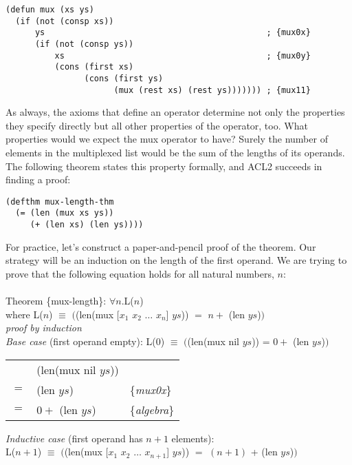 \label{mux-defun}
\begin{code}
\begin{verbatim}
(defun mux (xs ys)
  (if (not (consp xs))
      ys                                             ; {mux0x}
      (if (not (consp ys))
          xs                                         ; {mux0y}
          (cons (first xs)
                (cons (first ys)
                      (mux (rest xs) (rest ys))))))) ; {mux11}
\end{verbatim}
\end{code}

As always, the axioms that define an operator
determine not only the properties they specify directly
but all other properties of the operator, too.
What properties would we expect the \textsf{mux} operator to have?
Surely the number of elements in the multiplexed list
would be the sum of the lengths of its operands.
The following theorem states this property formally,
and ACL2 succeeds in finding a proof:

\label{mux-length-thm}
\begin{code}
\begin{verbatim}
(defthm mux-length-thm
  (= (len (mux xs ys))
     (+ (len xs) (len ys))))
\end{verbatim}
\end{code}

For practice, let's construct a paper-and-pencil proof of the theorem. %
Our strategy will be an induction on the length of the first operand.
We are trying to prove that the following equation holds for all natural numbers, $n$:\\
~\\
Theorem \{mux-length\}: $\forall n.$L($n$)\\
where L($n$) $\equiv$ $($\textsf{(len(mux [$x_1$ $x_2$ $\dots$ $x_n$] $ys$)) $=$ $n +$ (len $ys$)}$)$\\
\emph{proof by induction}\\
\emph{Base case} (first operand empty): L($0$) $\equiv$ $($\textsf{(len(mux nil $ys$)) = $0 +$ (len $ys$)}$)$
~\\[-1.0em]
\begin{center}
\begin{tabular}{lll}
     & \textsf{(len(mux nil $ys$)})    &                   \\
 $=$ & \textsf{(len $ys$)}             & \{\emph{mux0x}\}  \\
 $=$ & \textsf{$0 +$ (len $ys$)}       & \{\emph{algebra}\}\\
\end{tabular}
\end{center}
\label{mux-length-thm-induc-case}\emph{Inductive case} (first operand has $n+1$ elements):\\
\hspace*{1cm}L($n+1$) $\equiv$ $($\textsf{(len(mux [$x_1$ $x_2$ $\dots$ $x_{n+1}$] $ys$)) $=$ $(n+1)$ + (len $ys$)}$)$


